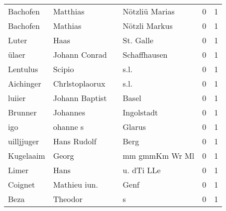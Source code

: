 \begin{center}
\begin{tiny}
\begin{longtabu}{llllrr}
                 Bachofen &                           Matthias &             &                              Nötzliü Marias &          0 &         1 \\
                 Bachofen &                            Mathias &             &                               Nötzli Markus &          0 &         1 \\
                    Luter &                               Haas &             &                                   St. Galle &          0 &         1 \\
                    ülaer &                      Johann Conrad &             &                                Schaffhausen &          0 &         1 \\
                 Lentulus &                             Scipio &             &                                        s.l. &          0 &         1 \\
                Aichinger &                     Chrlstoplaorux &             &                                        s.l. &          0 &         1 \\
                   luiier &                     Johann Baptist &             &                                       Basel &          0 &         1 \\
                  Brunner &                           Johannes &             &                                  Ingolstadt &          0 &         1 \\
                      igo &                           ohanne s &             &                                      Glarus &          0 &         1 \\
               uilljjuger &                        Hans Rudolf &             &                                        Berg &          0 &         1 \\
                Kugelaaim &                              Georg &             &                              mm gmmKm Wr Ml &          0 &         1 \\
                    Limer &                               Hans &             &                                  u. dTi LLe &          0 &         1 \\
                  Coignet &                       Mathieu iun. &             &                                        Genf &          0 &         1 \\
                     Beza &                            Theodor &             &                                           s &          0 &         1 \\

\end{longtabu}
\end{tiny}
\end{center}
